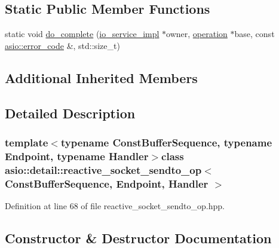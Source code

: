 \subsection*{Static Public Member Functions}
\begin{DoxyCompactItemize}
\item 
static void \hyperlink{classasio_1_1detail_1_1reactive__socket__sendto__op_a089a3f209e6f82bd98fa6d6edf599377}{do\+\_\+complete} (\hyperlink{namespaceasio_1_1detail_a6d61d9b8e53c11288be549d82aec5a42}{io\+\_\+service\+\_\+impl} $\ast$owner, \hyperlink{namespaceasio_1_1detail_a338968609bec20e37145309f8f9ec936}{operation} $\ast$base, const \hyperlink{classasio_1_1error__code}{asio\+::error\+\_\+code} \&, std\+::size\+\_\+t)
\end{DoxyCompactItemize}
\subsection*{Additional Inherited Members}


\subsection{Detailed Description}
\subsubsection*{template$<$typename Const\+Buffer\+Sequence, typename Endpoint, typename Handler$>$class asio\+::detail\+::reactive\+\_\+socket\+\_\+sendto\+\_\+op$<$ Const\+Buffer\+Sequence, Endpoint, Handler $>$}



Definition at line 68 of file reactive\+\_\+socket\+\_\+sendto\+\_\+op.\+hpp.



\subsection{Constructor \& Destructor Documentation}
\hypertarget{classasio_1_1detail_1_1reactive__socket__sendto__op_a355645ce5bcdea5b9d951150d6584b17}{}
